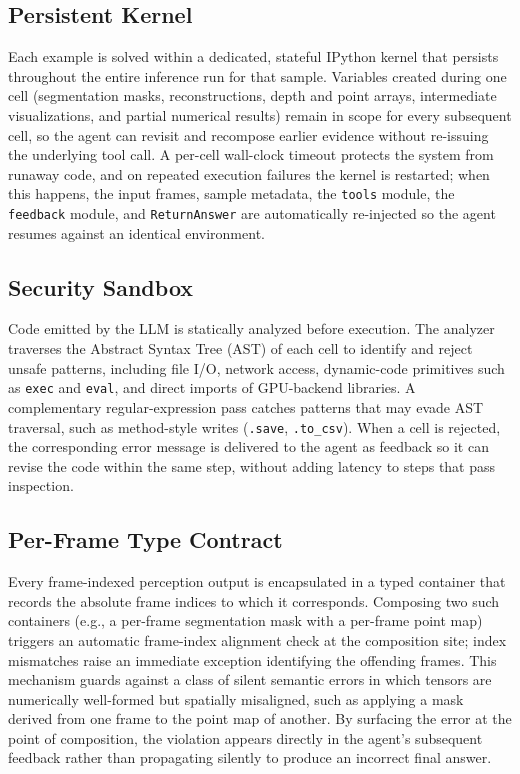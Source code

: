 \documentclass{llmxive}
\begin{document}
\subsection{Persistent Kernel}
\label{app:kernel}
Each example is solved within a dedicated, stateful IPython kernel that persists throughout the entire inference run for that sample. Variables created during one cell (segmentation masks, reconstructions, depth and point arrays, intermediate visualizations, and partial numerical results) remain in scope for every subsequent cell, so the agent can revisit and recompose earlier evidence without re-issuing the underlying tool call. A per-cell wall-clock timeout protects the system from runaway code, and on repeated execution failures the kernel is restarted; when this happens, the input frames, sample metadata, the \texttt{tools} module, the \texttt{feedback} module, and \texttt{ReturnAnswer} are automatically re-injected so the agent resumes against an identical environment.

\subsection{Security Sandbox}
\label{app:sandbox}
Code emitted by the LLM is statically analyzed before execution. The analyzer traverses the Abstract Syntax Tree (AST) of each cell to identify and reject unsafe patterns, including file I/O, network access, dynamic-code primitives such as \texttt{exec} and \texttt{eval}, and direct imports of GPU-backend libraries. A complementary regular-expression pass catches patterns that may evade AST traversal, such as method-style writes (\texttt{.save}, \texttt{.to\_csv}). When a cell is rejected, the corresponding error message is delivered to the agent as feedback so it can revise the code within the same step, without adding latency to steps that pass inspection.

\subsection{Per-Frame Type Contract}
\label{app:per_frame}
Every frame-indexed perception output is encapsulated in a typed container that records the absolute frame indices to which it corresponds. Composing two such containers (e.g., a per-frame segmentation mask with a per-frame point map) triggers an automatic frame-index alignment check at the composition site; index mismatches raise an immediate exception identifying the offending frames. This mechanism guards against a class of silent semantic errors in which tensors are numerically well-formed but spatially misaligned, such as applying a mask derived from one frame to the point map of another. By surfacing the error at the point of composition, the violation appears directly in the agent's subsequent feedback rather than propagating silently to produce an incorrect final answer.
\end{document}
